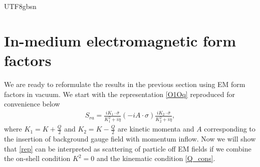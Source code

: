 \documentclass[11pt]{article}\def\baselinestretch{1.4}
\def\h{\eta}
\def\s{{\sigma}}
\begin{document}
\begin{CJK}{UTF8}{gbsn}


\section{In-medium electromagnetic form factors}\label{sec_3}

We are ready to reformulate the results in the previous section using EM form factors in vacuum. We start with the representation \eqref{O1Oq} reproduced for convenience below
\begin{align}\label{rep}
S_{ra}=\frac{iK_1\cdot\bar{\s}}{K_1^2+i\h}(-i A\cdot\s)\frac{iK_2\cdot\bar{\s}}{K_2^2+i\h},
\end{align}
where $K_1=K+\frac{Q}{2}$ and $K_2=K-\frac{Q}{2}$ are kinetic momenta and $A$ corresponding to the insertion of background gauge field with momentum inflow. Now we will show that \eqref{rep} can be interpreted as scattering of particle off EM fields if we combine the on-shell condition $K^2=0$ and the kinematic condition \eqref{Q_cons}.


\end{CJK}
\end{document}
